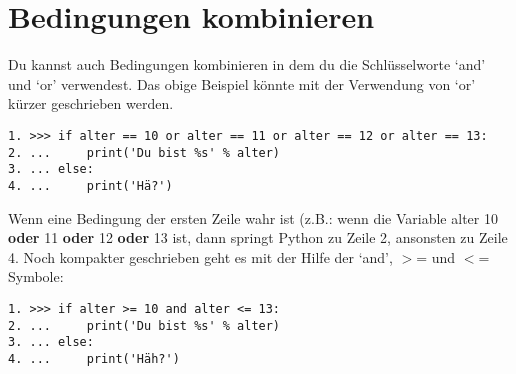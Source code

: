 \section{Bedingungen kombinieren}
Du kannst auch Bedingungen kombinieren in dem du die Schlüsselworte `and' und `or' verwendest. Das obige Beispiel könnte mit der Verwendung von `or' kürzer geschrieben werden.

\begin{listing}
\begin{verbatim}
1. >>> if alter == 10 or alter == 11 or alter == 12 or alter == 13:
2. ...     print('Du bist %s' % alter)
3. ... else:
4. ...     print('Hä?')
\end{verbatim}
\end{listing}

Wenn eine Bedingung der ersten Zeile wahr ist (z.B.: wenn die Variable alter 10 \textbf{oder} 11 \textbf{oder} 12 \textbf{oder} 13 ist, dann springt Python zu Zeile 2, ansonsten zu Zeile 4. Noch kompakter geschrieben geht es mit der Hilfe der `and', $>$= und $<$= Symbole:

\begin{listing}
\begin{verbatim}
1. >>> if alter >= 10 and alter <= 13:
2. ...     print('Du bist %s' % alter)
3. ... else:
4. ...     print('Häh?')
\end{verbatim}
\end{listing}

